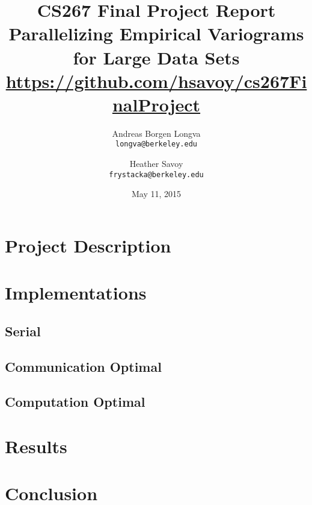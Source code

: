 \documentclass[11pt, oneside,titlepage]{article}   	%
\title{CS267 Final Project Report\\
  \large Parallelizing Empirical Variograms for Large Data Sets\\
  \url{https://github.com/hsavoy/cs267FinalProject}}
\author{Andreas Borgen Longva\\
  \texttt{longva@berkeley.edu}
  \and
  Heather Savoy\\
  \texttt{frystacka@berkeley.edu}}
\date{May 11, 2015}							%
\begin{document}
\maketitle
\section{Project Description}


\section{Implementations}
  \subsection{Serial}
    
  \subsection{Communication Optimal}
    
  \subsection{Computation Optimal}
   
   
\section{Results}
  

\section{Conclusion}
   



\end{document}
